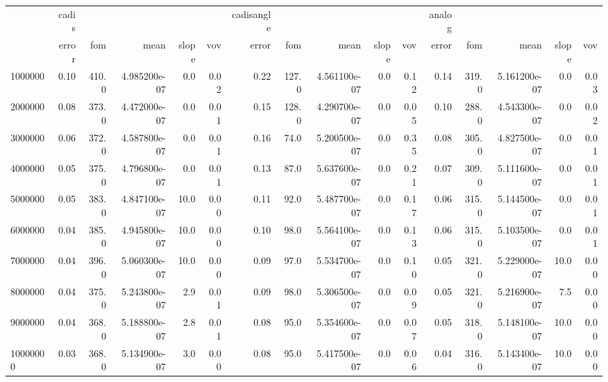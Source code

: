 \begin{tabular}{lrrrrrrrrrrrrrrr}
\toprule
{} & cadis &       &               &       &      & cadisangle &       &               &       &      & analog &       &               &       &      \\
{} & error &   fom &          mean & slope &  vov &      error &   fom &          mean & slope &  vov &  error &   fom &          mean & slope &  vov \\
\midrule
1000000  &  0.10 & 410.0 &  4.985200e-07 &   0.0 & 0.02 &       0.22 & 127.0 &  4.561100e-07 &   0.0 & 0.12 &   0.14 & 319.0 &  5.161200e-07 &   0.0 & 0.03 \\
2000000  &  0.08 & 373.0 &  4.472000e-07 &   0.0 & 0.01 &       0.15 & 128.0 &  4.290700e-07 &   0.0 & 0.05 &   0.10 & 288.0 &  4.543300e-07 &   0.0 & 0.02 \\
3000000  &  0.06 & 372.0 &  4.587800e-07 &   0.0 & 0.01 &       0.16 &  74.0 &  5.200500e-07 &   0.0 & 0.35 &   0.08 & 305.0 &  4.827500e-07 &   0.0 & 0.01 \\
4000000  &  0.05 & 375.0 &  4.796800e-07 &   0.0 & 0.01 &       0.13 &  87.0 &  5.637600e-07 &   0.0 & 0.21 &   0.07 & 309.0 &  5.111600e-07 &   0.0 & 0.01 \\
5000000  &  0.05 & 383.0 &  4.847100e-07 &  10.0 & 0.00 &       0.11 &  92.0 &  5.487700e-07 &   0.0 & 0.17 &   0.06 & 315.0 &  5.144500e-07 &   0.0 & 0.01 \\
6000000  &  0.04 & 385.0 &  4.945800e-07 &  10.0 & 0.00 &       0.10 &  98.0 &  5.564100e-07 &   0.0 & 0.13 &   0.06 & 315.0 &  5.103500e-07 &   0.0 & 0.01 \\
7000000  &  0.04 & 396.0 &  5.060300e-07 &  10.0 & 0.00 &       0.09 &  97.0 &  5.534700e-07 &   0.0 & 0.10 &   0.05 & 321.0 &  5.229000e-07 &  10.0 & 0.00 \\
8000000  &  0.04 & 375.0 &  5.243800e-07 &   2.9 & 0.01 &       0.09 &  98.0 &  5.306500e-07 &   0.0 & 0.09 &   0.05 & 321.0 &  5.216900e-07 &   7.5 & 0.00 \\
9000000  &  0.04 & 368.0 &  5.188800e-07 &   2.8 & 0.01 &       0.08 &  95.0 &  5.354600e-07 &   0.0 & 0.07 &   0.05 & 318.0 &  5.148100e-07 &  10.0 & 0.00 \\
10000000 &  0.03 & 368.0 &  5.134900e-07 &   3.0 & 0.00 &       0.08 &  95.0 &  5.417500e-07 &   0.0 & 0.06 &   0.04 & 316.0 &  5.143400e-07 &  10.0 & 0.00 \\
\bottomrule
\end{tabular}
